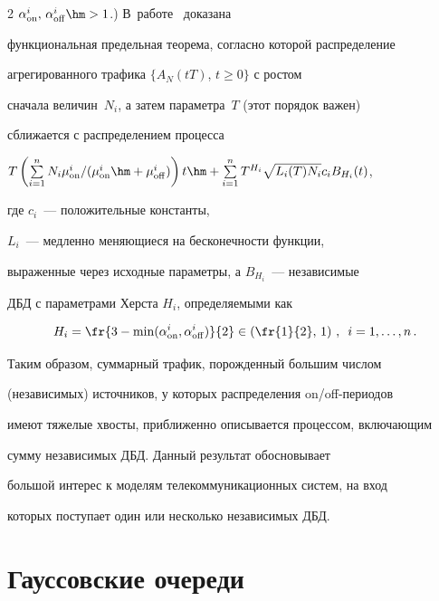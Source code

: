 \begin{multicols}{2}
$\alpha_{\mathrm{on}}^i,\, \alpha_{\mathrm{off}}^i\hm>1$.) В~работе~\cite{Taqqu} доказана


функциональная предельная теорема, согласно которой  распределение


агрегированного трафика $\{A_{N}(tT)$, $t \geq 0 \}$ с  ростом


сначала величин~$N_i$, а затем па\-ра\-мет\-ра~$T$ (этот порядок важен)


сближается с распределением процесса


$ %


T\left( \sum\limits_{i=1}^n N_i {\mu_{\mathrm{on}}^i}/({\mu_{\mathrm{on}}^i\hm+\mu_{\mathrm{off}}^i})


\right)t \hm+ \sum\limits_{i=1}^n T^{H_i} \sqrt{L_i(T)N_i}c_i B_{H_i}(t)$,




где $c_i$~--- положительные константы,


 $L_i$~--- медленно меняющиеся на бесконечности функции,


 выраженные через исходные параметры, а $B_{H_i}$~--- независимые


ДБД с па\-ра\-мет\-ра\-ми  Херста $H_i$, определяемыми  как


$$


H_i=\fr{3-\min(\alpha_{\mathrm{on}}^i,\alpha_{\mathrm{off}}^i)}{2}\in


\left(\fr{1}{2},\,1 \right)\,,\enskip i=1,\ldots, n\,.


$$


Таким образом,  суммарный трафик, порожденный  большим числом


(независимых) источников, у которых распределения on/off-пе\-рио\-дов


имеют тяжелые хвосты, приближенно  описывается процессом, включающим


сумму  независимых ДБД. Данный результат обосновывает


большой интерес  к  моделям телекоммуникационных систем, на вход


которых поступает один   или несколько  независимых ДБД.





\vspace*{-2pt}





\section{Гауссовские очереди}






\end{multicols}
